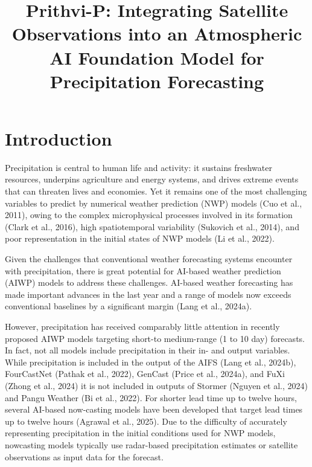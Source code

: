 \documentclass{ametsocV6.1}
\title{Prithvi-P: Integrating Satellite Observations into an Atmospheric AI Foundation Model for Precipitation Forecasting}
\affiliation{
  \aff{a}{Colorado State University, Fort Collins, USA}\\
  \aff{b}{University of Maryland, Baltimore County, Baltimore, Maryland, USA} \\
  \aff{c}{NASA Goddard Space Flight Center, Greenbelt, Maryland}
}
\begin{document}
\maketitle

%
%
%
\statement



%
\section{Introduction}
\label{sec:intro}


Precipitation is central to human life and activity: it sustains freshwater
resources, underpins agriculture and energy systems, and drives extreme events
that can threaten lives and economies. Yet it remains one of the most
challenging variables to predict by numerical weather prediction (NWP) models
(Cuo et al., 2011), owing to the complex microphysical processes involved in its
formation (Clark et al., 2016), high spatiotemporal variability (Sukovich et
al., 2014), and poor representation in the initial states of NWP models (Li et
al., 2022).

Given the challenges that conventional weather forecasting systems encounter
with precipitation, there is great potential for AI-based weather prediction
(AIWP) models to address these challenges. AI-based weather forecasting has made
important advances in the last year and a range of models now exceeds
conventional baselines by a significant margin (Lang et al., 2024a).

However, precipitation has received comparably little attention in recently
proposed AIWP models targeting short-to medium-range (1 to 10 day) forecasts. In
fact, not all models include precipitation in their in- and output variables.
While precipitation is included in the output of the AIFS (Lang et al., 2024b),
FourCastNet (Pathak et al., 2022), GenCast (Price et al., 2024a), and FuXi
(Zhong et al., 2024) it is not included in outputs of Stormer (Nguyen et al.,
2024) and Pangu Weather (Bi et al., 2022). For shorter lead time up to twelve
hours, several AI-based now-casting models have been developed that target lead
times up to twelve hours (Agrawal et al., 2025). Due to the difficulty of
accurately representing precipitation in the initial conditions used for NWP
models, nowcasting models typically use radar-based precipitation estimates or
satellite observations as input data for the forecast.
\end{document}
